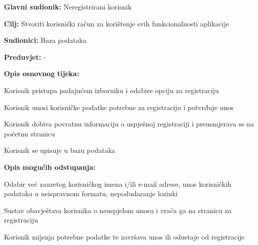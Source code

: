 					\noindent {}
					\begin{packed_item}
						
						\item \textbf{Glavni sudionik: } Neregistrirani korisnik 
						\item  \textbf{Cilj:} Stvoriti korisnički račun za korištenje svih funkcionalnosti aplikacije
						\item  \textbf{Sudionici:} Baza podataka 
						\item  \textbf{Preduvjet:} -
						\item  \textbf{Opis osnovnog tijeka:}
						
						\item[] \begin{packed_enum}
							
							\item Korisnik pristupa padajućem izborniku i odabire opciju za registraciju 
							\item Korisnik unosi korisničke podatke potrebne za registraciju i potvrđuje unos
							\item Korisnik dobiva povratnu informaciju o uspješnoj registraciji i preusmjerava se na početnu stranicu
							\item Korisnik se upisuje u bazu podataka
							
						\end{packed_enum}
						
						\item  \textbf{Opis mogućih odstupanja:}
						
						\item[] \begin{packed_item}
	
							\item[2.a] Odabir već zauzetog korisničkog imena i/ili e-mail adrese, unos korisničkih podataka u neispravnom formatu, nepodudaranje lozinki 
							\item[] \begin{packed_enum}
								
								\item Sustav obavještava korisnika o neuspjelom unosu i vraća ga na stranicu za registraciju 
								\item Korisnik mijenja potrebne podatke te završava unos ili odustaje od registracije
								
							\end{packed_enum}
							
							
						\end{packed_item}
					\end{packed_item}
				
